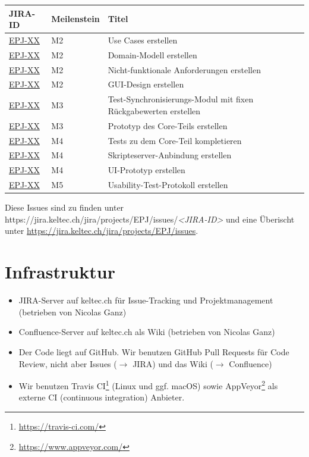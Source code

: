 \documentclass[a4paper]{article}
\let\oldsection\section
\renewcommand\section{\clearpage\oldsection}
\def\jiraurl{https://jira.keltec.ch/jira}
\newcommand{\jiraissue}[1]{\href{\jiraurl/projects/EPJ/issues/EPJ-#1}{EPJ-#1}}
\begin{document}
\begin{tabular}{ll<{\raggedright}p{29.5em}}
  \toprule
  JIRA-ID & Meilenstein & Titel \\
  \midrule
  \midrule
  \jiraissue{XX} & M2 & Use Cases erstellen \\
  \jiraissue{XX} & M2 & Domain-Modell erstellen \\
  \jiraissue{XX} & M2 & Nicht-funktionale Anforderungen erstellen \\
  \jiraissue{XX} & M2 & GUI-Design erstellen \\
  \midrule
  \jiraissue{XX} & M3 & Test-Synchronisierungs-Modul mit fixen Rückgabewerten erstellen \\
  \jiraissue{XX} & M3 & Prototyp des Core-Teils erstellen \\
  \midrule
  \jiraissue{XX} & M4 & Tests zu dem Core-Teil kompletieren \\
  \jiraissue{XX} & M4 & Skripteserver-Anbindung erstellen \\
  \jiraissue{XX} & M4 & UI-Prototyp erstellen \\
  \midrule
  \jiraissue{XX} & M5 & Usability-Test-Protokoll erstellen \\
  \bottomrule
\end{tabular}

Diese Issues sind zu finden unter \jiraurl/projects/EPJ/issues/\emph{\textless JIRA-ID\textgreater} und eine Überischt unter \url{\jiraurl/projects/EPJ/issues}.

\section{Infrastruktur}
\begin{itemize}
  \item JIRA-Server auf keltec.ch für Issue-Tracking und Projektmanagement
    (betrieben von Nicolas Ganz)
  \item Confluence-Server auf keltec.ch als Wiki (betrieben von Nicolas Ganz)
  \item Der Code liegt auf GitHub.
    Wir benutzen GitHub Pull Requests für Code Review, nicht aber Issues ($\rightarrow$ JIRA)
    und das Wiki ($\rightarrow$ Confluence)
  \item Wir benutzen Travis CI\footnote{\url{https://travis-ci.com/}} (Linux und
    ggf. macOS) sowie AppVeyor\footnote{\url{https://www.appveyor.com/}} als
    externe CI (continuous integration) Anbieter.
\end{itemize}
\end{document}
